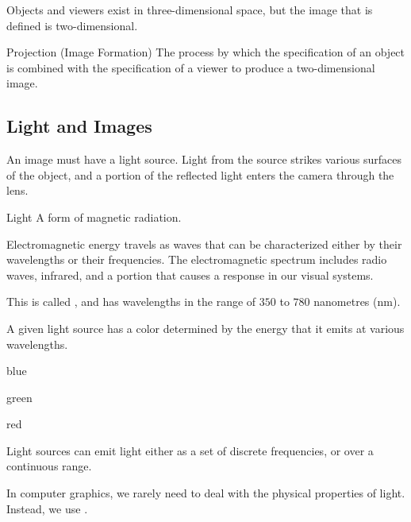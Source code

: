 \documentclass[../COS3712_Notes.tex]{subfiles}
\begin{document}
        Objects and viewers exist in three-dimensional space,
        but the image that is defined is two-dimensional.

        \begin{definition}{Projection (Image Formation)}
          The process by which the specification of an object is combined with the specification
          of a viewer to produce a two-dimensional image.
        \end{definition}

      \subsection{Light and Images}
        An image must have a light source.
        Light from the source strikes various surfaces of the object,
        and a portion of the reflected light enters the camera through the lens.

        \begin{definition}{Light}
          A form of magnetic radiation.

          Electromagnetic energy travels as waves that can be characterized either by
          their wavelengths or their frequencies.
          The electromagnetic spectrum includes radio waves, infrared, and a portion that
          causes a response in our visual systems.

          This  is called ,
          and has wavelengths in the range of $350$ to $780$ nanometres (nm).

          A given light source has a color determined by the energy that it emits at various
          wavelengths.

          \begin{center}
            \begin{itemize*}[itemjoin=\quad, label={ }]
              \item {} blue
              \item {} green
              \item {} red
            \end{itemize*}
          \end{center}
        \end{definition}

        Light sources can emit light either as a set of discrete frequencies,
        or over a continuous range.

        In computer graphics, we rarely need to deal with the physical properties of light.
        Instead, we use .
\end{document}
